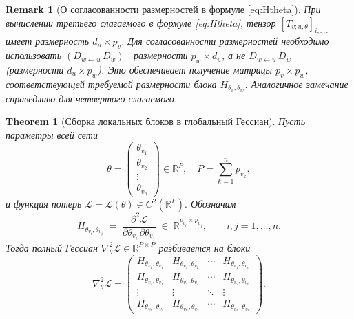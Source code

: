 \documentclass[11pt]{article}
\newtheorem{theorem}{Theorem}
\newtheorem{remark}{Remark}
\begin{document}
\begin{remark}[О согласованности размерностей в формуле \eqref{eq:Htheta}]
  При вычислении третьего слагаемого в формуле \eqref{eq:Htheta}, тензор $[T_{v;u,\theta}]_{i,:,:}$ имеет
  размерность $d_u\times p_v$. Для согласованности размерностей необходимо использовать
  $(D_{w\gets u}\,D_w)^{\top}$ размерности $p_w\times d_u$, а не $D_{w\gets u}\,D_w$ (размерности $d_u\times p_w$).
  Это обеспечивает получение матрицы $p_v\times p_w$, соответствующей требуемой размерности блока
  $H_{\theta_v,\theta_w}$.
  Аналогичное замечание справедливо для четвертого слагаемого.
\end{remark}

\begin{theorem}[Сборка локальных блоков в глобальный Гессиан]
  Пусть параметры всей сети
  \[
    \theta =
    \begin{pmatrix}\theta_{v_1}\\ \theta_{v_2}\\ \vdots\\ \theta_{v_n}
    \end{pmatrix}
    \in \mathbb R^P,
    \quad
    P = \sum_{k=1}^n p_{v_k},
  \]
  и функция потерь $\mathcal L=\mathcal L(\theta)\in C^2(\mathbb R^P).$ Обозначим
  \[
    H_{\theta_{v_i},\theta_{v_j}}
    \;=\;
    \frac{\partial^2 \mathcal L}{\partial\theta_{v_i}\,\partial\theta_{v_j}}
    \;\in\;\mathbb R^{p_{v_i}\times p_{v_j}},
    \qquad
    i,j=1,\dots,n.
  \]
  Тогда полный Гессиан $\nabla^2_\theta \mathcal L\in\mathbb R^{P\times P}$
  разбивается на блоки
  \[
    \nabla^2_\theta \mathcal L
    =
    \begin{pmatrix}
      H_{\theta_{v_1},\theta_{v_1}} & H_{\theta_{v_1},\theta_{v_2}} & \cdots & H_{\theta_{v_1},\theta_{v_n}}\\
      H_{\theta_{v_2},\theta_{v_1}} & H_{\theta_{v_2},\theta_{v_2}} & \cdots & H_{\theta_{v_2},\theta_{v_n}}\\
      \vdots & \vdots & \ddots & \vdots\\
      H_{\theta_{v_n},\theta_{v_1}} & H_{\theta_{v_n},\theta_{v_2}} & \cdots & H_{\theta_{v_n},\theta_{v_n}}
    \end{pmatrix}.
  \]
\end{theorem}
\end{document}
